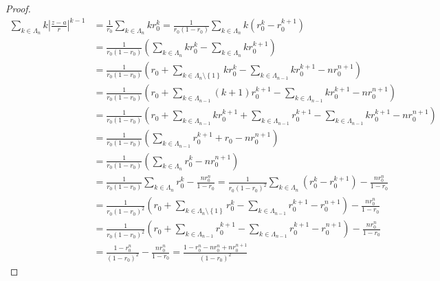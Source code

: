 \documentclass[dvipdfmx]{jsarticle}
\begin{document}
\begin{proof}
\begin{align*}
\sum_{k \in \varLambda_{n}} {k\left| \frac{z - a}{r} \right|^{k - 1}} &= \frac{1}{r_{0}}\sum_{k \in \varLambda_{n}} {kr_{0}^{k}} = \frac{1}{r_{0}\left( 1 - r_{0} \right)}\sum_{k \in \varLambda_{n}} {k\left( r_{0}^{k} - r_{0}^{k + 1} \right)}\\
&= \frac{1}{r_{0}\left( 1 - r_{0} \right)}\left( \sum_{k \in \varLambda_{n}} {kr_{0}^{k}} - \sum_{k \in \varLambda_{n}} {kr_{0}^{k + 1}} \right)\\
&= \frac{1}{r_{0}\left( 1 - r_{0} \right)}\left( r_{0} + \sum_{k \in \varLambda_{n} \setminus \left\{ 1 \right\}} {kr_{0}^{k}} - \sum_{k \in \varLambda_{n - 1}} {kr_{0}^{k + 1}} - nr_{0}^{n + 1} \right)\\
&= \frac{1}{r_{0}\left( 1 - r_{0} \right)}\left( r_{0} + \sum_{k \in \varLambda_{n - 1}} {(k + 1)r_{0}^{k + 1}} - \sum_{k \in \varLambda_{n - 1}} {kr_{0}^{k + 1}} - nr_{0}^{n + 1} \right)\\
&= \frac{1}{r_{0}\left( 1 - r_{0} \right)}\left( r_{0} + \sum_{k \in \varLambda_{n - 1}} {kr_{0}^{k + 1}} + \sum_{k \in \varLambda_{n - 1}} r_{0}^{k + 1} - \sum_{k \in \varLambda_{n - 1}} {kr_{0}^{k + 1}} - nr_{0}^{n + 1} \right)\\
&= \frac{1}{r_{0}\left( 1 - r_{0} \right)}\left( \sum_{k \in \varLambda_{n - 1}} r_{0}^{k + 1} + r_{0} - nr_{0}^{n + 1} \right) \\
&= \frac{1}{r_{0}\left( 1 - r_{0} \right)}\left( \sum_{k \in \varLambda_{n}} r_{0}^{k} - nr_{0}^{n + 1} \right)\\
&= \frac{1}{r_{0}\left( 1 - r_{0} \right)}\sum_{k \in \varLambda_{n}} r_{0}^{k} - \frac{nr_{0}^{n}}{1 - r_{0}} = \frac{1}{r_{0}\left( 1 - r_{0} \right)^{2}}\sum_{k \in \varLambda_{n}} \left( r_{0}^{k} - r_{0}^{k + 1} \right) - \frac{nr_{0}^{n}}{1 - r_{0}}\\
&= \frac{1}{r_{0}\left( 1 - r_{0} \right)^{2}}\left( r_{0} + \sum_{k \in \varLambda_{n} \setminus \left\{ 1 \right\}} r_{0}^{k} - \sum_{k \in \varLambda_{n - 1}} r_{0}^{k + 1} - r_{0}^{n + 1} \right) - \frac{nr_{0}^{n}}{1 - r_{0}}\\
&= \frac{1}{r_{0}\left( 1 - r_{0} \right)^{2}}\left( r_{0} + \sum_{k \in \varLambda_{n - 1}} r_{0}^{k + 1} - \sum_{k \in \varLambda_{n - 1}} r_{0}^{k + 1} - r_{0}^{n + 1} \right) - \frac{nr_{0}^{n}}{1 - r_{0}}\\
&= \frac{1 - r_{0}^{n}}{\left( 1 - r_{0} \right)^{2}} - \frac{nr_{0}^{n}}{1 - r_{0}} = \frac{1 - r_{0}^{n} - nr_{0}^{n} + nr_{0}^{n + 1}}{\left( 1 - r_{0} \right)^{2}}
\end{align*}

\end{proof}
\end{document}

